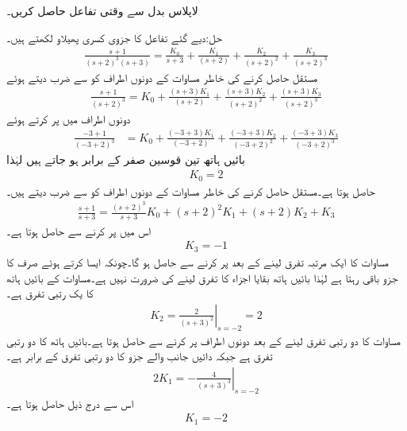 لاپلاس بدل  سے وقتی تفاعل حاصل کریں۔

حل:دیے گئے تفاعل کا جزوی کسری پھیلاو لکھتے ہیں۔
\begin{align}\label{مساوات_لاپلاس_مثال_کثیر_قطبین_الف}
\frac{s+1}{(s+2)^3(s+3)}=\frac{K_0}{s+3}+\frac{K_1}{(s+2)}+\frac{K_2}{(s+2)^2}+\frac{K_3}{(s+2)^3}
\end{align}
مستقل  حاصل کرنے کی خاطر مساوات کے دونوں اطراف کو  سے ضرب دیتے ہوئے
\begin{align*}
\frac{s+1}{(s+2)^3}=K_0+\frac{(s+3)K_1}{(s+2)}+\frac{(s+3)K_2}{(s+2)^2}+\frac{(s+3)K_3}{(s+2)^3}
\end{align*}
دونوں اطراف میں  پر کرتے ہوئے
\begin{align*}
\frac{-3+1}{(-3+2)^3}&=K_0+\frac{(-3+3)K_1}{(-3+2)}+\frac{(-3+3)K_2}{(-3+2)^2}+\frac{(-3+3)K_3}{(-3+2)^3}
\end{align*}
 بائیں ہاتھ تین قوسین صفر کے برابر ہو جاتے ہیں لہٰذا
\begin{align*}
K_0=2
\end{align*}
حاصل ہوتا ہے۔مستقل  حاصل کرنے کی خاطر مساوات  کے دونوں اطراف کو  سے ضرب دیتے ہیں۔
\begin{align}\label{مساوات_لاپلاس_مثال_کثیر_قطبین_ب}
\frac{s+1}{s+3}=\frac{(s+2)^3}{s+3}K_0+(s+2)^2 K_1+(s+2)K_2+K_3
\end{align}
اس میں  پر کرنے سے  حاصل ہوتا ہے۔
\begin{align*}
K_3=-1
\end{align*}
مساوات  کا ایک مرتبہ تفرق لینے کے بعد  پر کرنے سے  حاصل ہو گا۔چونکہ ایسا کرتے ہوئے صرف  کا جزو باقی رہتا ہے لہٰذا بائیں ہاتھ بقایا اجزاء کا تفرق  لینے کی ضرورت نہیں ہے۔مساوات کے بائیں ہاتھ کا یک رتبی تفرق  ہے۔
\begin{align*}
K_2=\left. \frac{2}{(s+3)^2} \right|_{s=-2}=2
\end{align*}
مساوات  کا دو رتبی تفرق لینے کے بعد دونوں اطراف  پر کرنے سے  حاصل ہوتا ہے۔بائیں ہاتھ کا دو رتبی تفرق  ہے جبکہ دائیں جانب  والے جزو کا دو رتبی تفرق  کے برابر ہے۔ 
\begin{align*}
2K_1=\left. -\frac{4}{(s+3)^3} \right|_{s=-2}
\end{align*}
اس سے درج ذیل حاصل ہوتا ہے۔
\begin{align*}
K_1=-2
\end{align*}
